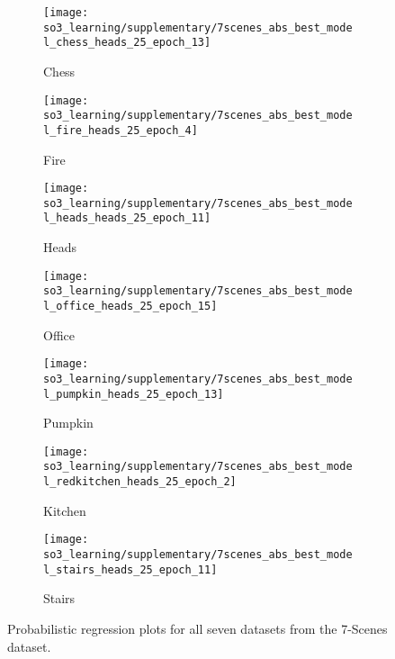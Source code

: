 \begin{figure*}
	\centering
	\begin{subfigure}[]{0.43\textwidth}
		\texttt{[image: so3\_learning/supplementary/7scenes\_abs\_best\_model\_chess\_heads\_25\_epoch\_13]}
		\caption{Chess}
	\end{subfigure}
	\begin{subfigure}[]{0.43\textwidth} 
		\texttt{[image: so3\_learning/supplementary/7scenes\_abs\_best\_model\_fire\_heads\_25\_epoch\_4]}
		\caption{Fire}
	\end{subfigure}
	\begin{subfigure}[]{0.43\textwidth} 
		\texttt{[image: so3\_learning/supplementary/7scenes\_abs\_best\_model\_heads\_heads\_25\_epoch\_11]}
		\caption{Heads}
	\end{subfigure}
	\begin{subfigure}[]{0.43\textwidth} 
		\texttt{[image: so3\_learning/supplementary/7scenes\_abs\_best\_model\_office\_heads\_25\_epoch\_15]}
		\caption{Office}
	\end{subfigure}
	\begin{subfigure}[]{0.43\textwidth} 
		\texttt{[image: so3\_learning/supplementary/7scenes\_abs\_best\_model\_pumpkin\_heads\_25\_epoch\_13]}
		\caption{Pumpkin}
	\end{subfigure}
	\begin{subfigure}[]{0.43\textwidth} 
		\texttt{[image: so3\_learning/supplementary/7scenes\_abs\_best\_model\_redkitchen\_heads\_25\_epoch\_2]}
		\caption{Kitchen}
	\end{subfigure}
	\begin{subfigure}[]{0.43\textwidth} 
		\texttt{[image: so3\_learning/supplementary/7scenes\_abs\_best\_model\_stairs\_heads\_25\_epoch\_11]}
		\caption{Stairs}
	\end{subfigure}
	\caption{Probabilistic regression plots for all seven datasets from the 7-Scenes dataset.}
	\label{fig:7scenes_regression}
\end{figure*}


